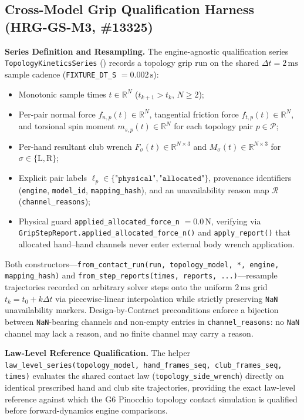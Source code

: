 \documentclass[11pt,a4paper]{article}
\newcommand{\R}{\mathbb{R}}
\begin{document}
\subsection{Cross-Model Grip Qualification Harness (HRG-GS-M3, \#13325)}
\textbf{Series Definition and Resampling.}
The engine-agnostic qualification series \texttt{TopologyKineticsSeries} () records a topology grip run on the shared $\Delta t = 2\,\mathrm{ms}$ sample cadence (\texttt{FIXTURE\_DT\_S} $= 0.002\,\mathrm{s}$):
\begin{itemize}[leftmargin=*,noitemsep]
\item Monotonic sample times $t \in \R^N$ ($t_{k+1} > t_k$, $N \ge 2$);
\item Per-pair normal force $f_{n,p}(t) \in \R^N$, tangential friction force $f_{t,p}(t) \in \R^N$, and torsional spin moment $m_{s,p}(t) \in \R^N$ for each topology pair $p \in \mathcal{P}$;
\item Per-hand resultant club wrench $F_{\sigma}(t) \in \R^{N\times 3}$ and $M_{\sigma}(t) \in \R^{N\times 3}$ for $\sigma \in \{\mathrm{L}, \mathrm{R}\}$;
\item Explicit pair labels $\ell_p \in \{\texttt{"physical"}, \texttt{"allocated"}\}$, provenance identifiers (\texttt{engine}, \texttt{model\_id}, \texttt{mapping\_hash}), and an unavailability reason map $\mathcal{R}$ (\texttt{channel\_reasons});
\item Physical guard \texttt{applied\_allocated\_force\_n} $= 0.0\,\mathrm{N}$, verifying via \texttt{GripStepReport.applied\_allocated\_force\_n()} and \texttt{apply\_report()} that allocated hand--hand channels never enter external body wrench application.
\end{itemize}
Both constructors---\texttt{from\_contact\_run(run, topology\_model, *, engine, mapping\_hash)} and \texttt{from\_step\_reports(times, reports, ...)}---resample trajectories recorded on arbitrary solver steps onto the uniform $2\,\mathrm{ms}$ grid $t_k = t_0 + k\Delta t$ via piecewise-linear interpolation while strictly preserving \texttt{NaN} unavailability markers. Design-by-Contract preconditions enforce a bijection between \texttt{NaN}-bearing channels and non-empty entries in \texttt{channel\_reasons}: no \texttt{NaN} channel may lack a reason, and no finite channel may carry a reason.

\textbf{Law-Level Reference Qualification.}
The helper \texttt{law\_level\_series(topology\_model, hand\_frames\_seq, club\_frames\_seq, times)} evaluates the shared contact law (\texttt{topology\_side\_wrench}) directly on identical prescribed hand and club site trajectories, providing the exact law-level reference against which the G6 Pinocchio topology contact simulation is qualified before forward-dynamics engine comparisons.
\end{document}
